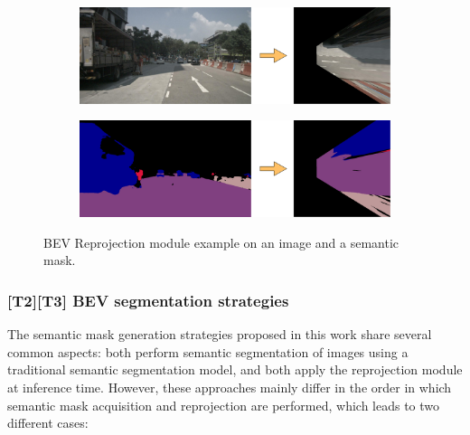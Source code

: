 \begin{figure}[htbp]
    \centering
    \begin{subfigure}[b]{\textwidth} 
        \centering 
        \begin{minipage}[b]{0.75\textwidth} 
            \includegraphics[width=\linewidth]{images/methodology/image_bev_reprojection.png}
        \end{minipage}
    \end{subfigure}
    
    \vspace{0.5cm} 

    \begin{subfigure}[b]{\textwidth} 
        \centering
        \begin{minipage}[b]{0.75\textwidth}
            \includegraphics[width=\linewidth]{images/methodology/mask_bev_reprojection.png}
        \end{minipage}
    \end{subfigure}
    
    \caption{BEV Reprojection module example on an image and a semantic mask.}
    \label{fig:bev_reprojection}
\end{figure}


\subsubsection{[T2][T3] BEV segmentation strategies}
The  semantic mask generation strategies proposed in this work share several common aspects: both perform semantic segmentation of images using a traditional semantic segmentation model, and both apply the  reprojection module at inference time. However, these approaches mainly differ in the order in which semantic mask acquisition and reprojection are performed, which leads to two different cases:

